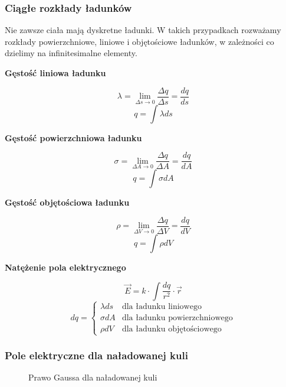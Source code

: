 \documentclass{../notatki}
\begin{document}
\subsubsection{Ciągłe rozkłady ładunków}

Nie zawsze ciała mają dyskretne ładunki. W takich przypadkach rozważamy rozkłady
powierzchniowe, liniowe i objętościowe ładunków, w zależności co dzielimy
na infinitesimalne elementy.

\textbf{Gęstość liniowa ładunku}

$$
\lambda = \lim_{\Delta s \rightarrow 0} \frac{\Delta q}{\Delta s} =
\frac{dq}{ds}
$$
$$
q = \int \lambda ds
$$

\textbf{Gęstość powierzchniowa ładunku}

$$
\sigma = \lim_{\Delta A \rightarrow 0} \frac{\Delta q}{\Delta A} =
\frac{dq}{dA}
$$
$$
q = \int \sigma dA
$$

\textbf{Gęstość objętościowa ładunku}

$$
\rho = \lim_{\Delta V \rightarrow 0} \frac{\Delta q}{\Delta V} =
\frac{dq}{dV}
$$
$$
q = \int \rho dV
$$

\textbf{Natężenie pola elektrycznego}

$$
\vec{E} = k \cdot \int \frac{dq}{r^2} \cdot \vec{r}
$$
$$
dq =
\begin{cases}
  \lambda ds & \text{dla ładunku liniowego} \\
  \sigma dA & \text{dla ładunku powierzchniowego} \\
  \rho dV & \text{dla ładunku objętościowego}
\end{cases}
$$

\subsubsection{Pole elektryczne dla naładowanej kuli}

\begin{figure*}[h]
  \centering
  \caption{Prawo Gaussa dla naładowanej kuli}
\end{figure*}
\end{document}

